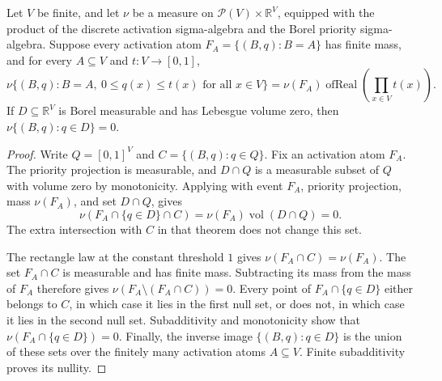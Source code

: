 \begin{helper}
Let \(V\) be finite, and let \(\nu\) be a measure on
\(\mathcal P(V)\times\mathbb R^V\), equipped with the product of the discrete
activation sigma-algebra and the Borel priority sigma-algebra.
Suppose every activation atom \(F_A=\{(B,q):B=A\}\) has finite mass, and
for every \(A\subseteq V\) and \(t:V\to[0,1]\),
\[
\nu\{(B,q):B=A,\ 0\le q(x)\le t(x)\text{ for all }x\in V\}
=\nu(F_A)\operatorname{ofReal}\!\left(\prod_{x\in V}t(x)\right).
\]
If \(D\subseteq\mathbb R^V\) is Borel measurable and has Lebesgue volume
zero, then \(\nu\{(B,q):q\in D\}=0\).
\end{helper}
\begin{proof}
Write \(Q=[0,1]^V\) and \(C=\{(B,q):q\in Q\}\).
Fix an activation atom \(F_A\). The priority projection is measurable,
and \(D\cap Q\) is a measurable subset of \(Q\) with volume zero by
monotonicity. Applying
with event \(F_A\), priority projection, mass \(\nu(F_A)\), and set
\(D\cap Q\), gives
\[
\nu(F_A\cap\{q\in D\}\cap C)=\nu(F_A)\operatorname{vol}(D\cap Q)=0.
\]
The extra intersection with \(C\) in that theorem does not change this set.

The rectangle law at the constant threshold \(1\) gives
\(\nu(F_A\cap C)=\nu(F_A)\). The set \(F_A\cap C\) is measurable and
has finite mass. Subtracting its mass from the mass of \(F_A\) therefore
gives \(\nu(F_A\setminus(F_A\cap C))=0\).
Every point of \(F_A\cap\{q\in D\}\) either belongs to \(C\), in which
case it lies in the first null set, or does not, in which case it lies in
the second null set. Subadditivity and monotonicity show that
\(\nu(F_A\cap\{q\in D\})=0\).
Finally, the inverse image \(\{(B,q):q\in D\}\) is the union of these
sets over the finitely many activation atoms \(A\subseteq V\).
Finite subadditivity proves its nullity.
\end{proof}
